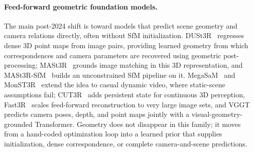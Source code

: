\paragraph{Feed-forward geometric foundation models.}
The main post-2024 shift is toward models that predict scene geometry and camera relations directly, often without SfM initialization.
DUSt3R~\cite{wang2024dust3r} regresses dense 3D point maps from image pairs, providing learned geometry from which correspondences and camera parameters are recovered using geometric post-processing; MASt3R~\cite{mast3r} grounds image matching in this 3D representation, and MASt3R-SfM~\cite{MASt3R_SfM} builds an unconstrained SfM pipeline on it.
MegaSaM~\cite{li2025megasam} and MonST3R~\cite{monst3r} extend the idea to casual dynamic video, where static-scene assumptions fail; CUT3R~\cite{wang2025Cut3R} adds persistent state for continuous 3D perception, Fast3R~\cite{yang2025fast3r} scales feed-forward reconstruction to very large image sets, and VGGT~\cite{wang2025vggt} predicts camera poses, depth, and point maps jointly with a visual-geometry-grounded Transformer.
Geometry does not disappear in this family; it moves from a hand-coded optimization loop into a learned prior that supplies initialization, dense correspondence, or complete camera-and-scene predictions.

